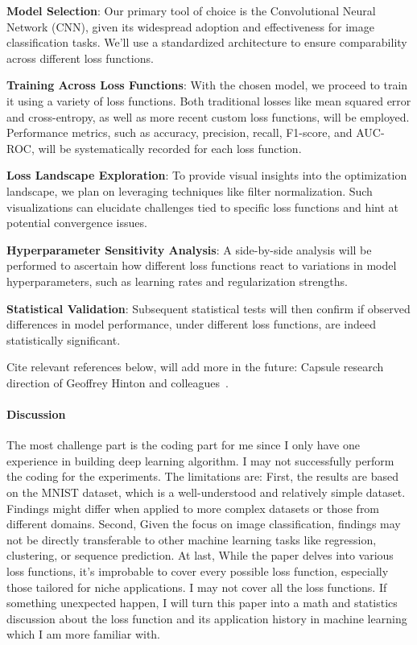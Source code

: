 \documentclass[12pt]{article}
\begin{document}
\textbf{Model Selection}: Our primary tool of choice is the Convolutional Neural Network (CNN), given its widespread adoption and effectiveness for image classification tasks. We'll use a standardized architecture to ensure comparability across different loss functions.

\textbf{Training Across Loss Functions}: With the chosen model, we proceed to train it using a variety of loss functions. Both traditional losses like mean squared error and cross-entropy, as well as more recent custom loss functions, will be employed. Performance metrics, such as accuracy, precision, recall, F1-score, and AUC-ROC, will be systematically recorded for each loss function.

\textbf{Loss Landscape Exploration}: To provide visual insights into the optimization landscape, we plan on leveraging techniques like filter normalization. Such visualizations can elucidate challenges tied to specific loss functions and hint at potential convergence issues.

\textbf{Hyperparameter Sensitivity Analysis}: A side-by-side analysis will be performed to ascertain how different loss functions react to variations in model hyperparameters, such as learning rates and regularization strengths.

\textbf{Statistical Validation}: Subsequent statistical tests will then confirm if observed differences in model performance, under different loss functions, are indeed statistically significant.

Cite relevant references below, will add more in the future:
Capsule research direction of Geoffrey Hinton and colleagues~\citep[see, e.g.,][]{byerly2020norouting}.


\paragraph{Discussion}
The most challenge part is the coding part for me since I only have one experience in building deep learning algorithm. I may not successfully perform the coding for the experiments. 
The limitations are: 
First, the results are based on the MNIST dataset, which is a well-understood and relatively simple dataset. Findings might differ when applied to more complex datasets or those from different domains.
Second, Given the focus on image classification, findings may not be directly transferable to other machine learning tasks like regression, clustering, or sequence prediction.
At last, While the paper delves into various loss functions, it's improbable to cover every possible loss function, especially those tailored for niche applications. I may not cover all the loss functions.
If something unexpected happen, I will turn this paper into a math and statistics discussion about the loss function and its application history in machine learning which I am more familiar with.



\end{document}
